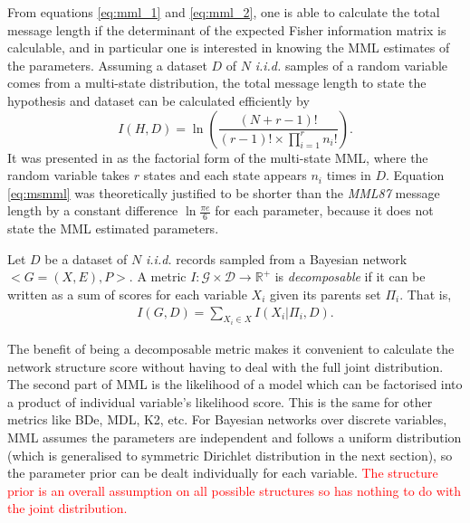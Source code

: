 From equations \ref{eq:mml_1} and \ref{eq:mml_2}, one is able to calculate the total message length if the determinant of the expected Fisher information matrix is calculable, and in particular one is interested in knowing the MML estimates of the parameters.  Assuming a dataset $D$ of $N$ \textit{i.i.d.} samples of a random variable comes from a multi-state distribution, the total message length to state the hypothesis and dataset can be calculated efficiently by 
\begin{equation}
\label{eq:msmml}
I(H, D) = \ln \left(\frac{(N+r-1)!}{(r-1)!\times \prod_{i=1}^{r} n_i!} \right).
\end{equation}
It was presented in \cite{boulton1969information} as the factorial form of the multi-state MML, where the random variable takes $r$ states and each state appears $n_i$ times in $D$. Equation \ref{eq:msmml} was theoretically justified to be shorter than the \textit{MML87} message length by a constant difference $\ln\frac{\pi e}{6}$ for each parameter, because it does not state the MML estimated parameters. 

\begin{definition}
\label{def:decomp}
Let $D$ be a dataset of $N$ \textit{i.i.d.} records sampled from a Bayesian network $<G=(X,E), P>$. A metric $I:\mathcal{G} \times \mathcal{D} \rightarrow \mathbb{R}^+$ is \textit{decomposable} if it can be written as a sum of scores for each variable $X_i$ given its parents set $\Pi_i$. That is, 
\begin{align*}
I(G, D) = \sum_{X_i \in X} I(X_i|\Pi_i, D).
\end{align*}

\end{definition}
The benefit of being a decomposable metric makes it convenient to calculate the network structure score without having to deal with the full joint distribution. The second part of MML is the likelihood of a model which can be factorised into a product of individual variable's likelihood score. This is the same for other metrics like BDe, MDL, K2, etc. For Bayesian networks over discrete variables, MML assumes the parameters are independent and follows a uniform distribution (which is generalised to symmetric Dirichlet distribution in the next section), so the parameter prior can be dealt individually for each variable. \textcolor{red}{The structure prior is an overall assumption on all possible structures so has nothing to do with the joint distribution.}
 
